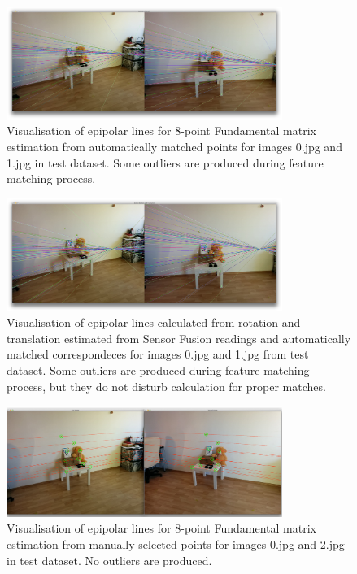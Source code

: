 \begin{figure}[h!]
    \centering
    \includegraphics[width=0.8\textwidth]{f_01_8point}
    \caption[Visualisation of epipolar lines for 8-point Fundamental matrix estimation with outliers from automiatically matched correspondences - 1st example]{Visualisation of epipolar lines for 8-point Fundamental matrix estimation from automatically matched points for images 0.jpg and 1.jpg in test dataset. Some outliers are produced during feature matching process.}
    \label{fig:f_01_8point}
\end{figure}

\begin{figure}[h!]
    \centering
    \includegraphics[width=0.8\textwidth]{f_01_sensor}
    \caption[Visualisation of epipolar lines calculated from rotation and translation estimated from Sensor Fusion readings - 1st example]{Visualisation of epipolar lines calculated from rotation and translation estimated from Sensor Fusion readings and automatically matched correspondeces for images 0.jpg and 1.jpg from test dataset. Some outliers are produced during feature matching process, but they do not disturb calculation for proper matches.}
    \label{fig:f_01_sensor}
\end{figure}

\begin{figure}[h!]
    \centering
    \includegraphics[width=0.8\textwidth]{f_02}
    \caption[Visualisation of epipolar lines for 8-point Fundamental matrix estimation - 1st example]{Visualisation of epipolar lines for 8-point Fundamental matrix estimation from manually selected points for images 0.jpg and 2.jpg in test dataset. No outliers are produced.}
    \label{fig:f_02_epi}
\end{figure}

